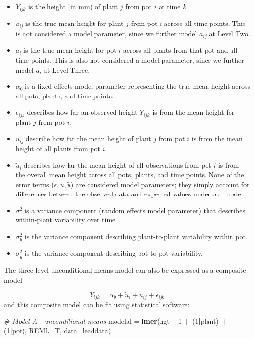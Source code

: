 \documentclass[
]{krantz}
\newenvironment{Shaded}{\begin{snugshade}}{\end{snugshade}}
\newcommand{\CommentTok}[1]{\textcolor[rgb]{0.37,0.37,0.37}{\textit{#1}}}
\newcommand{\DataTypeTok}[1]{\textcolor[rgb]{0.27,0.27,0.27}{#1}}
\newcommand{\DecValTok}[1]{\textcolor[rgb]{0.06,0.06,0.06}{#1}}
\newcommand{\KeywordTok}[1]{\textcolor[rgb]{0.27,0.27,0.27}{\textbf{#1}}}
\newcommand{\NormalTok}[1]{#1}
\newcommand{\OperatorTok}[1]{\textcolor[rgb]{0.43,0.43,0.43}{\textbf{#1}}}
\newcommand{\StringTok}[1]{\textcolor[rgb]{0.5,0.5,0.5}{#1}}
\providecommand{\tightlist}{%
  \setlength{\itemsep}{0pt}\setlength{\parskip}{0pt}}
\begin{document}
\begin{itemize}
\tightlist
\item
  \(Y_{ijk}\) is the height (in mm) of plant \(j\) from pot \(i\) at time \(k\)
\item
  \(a_{ij}\) is the true mean height for plant \(j\) from pot \(i\) across all time points. This is not considered a model parameter, since we further model \(a_{ij}\) at Level Two.
\item
  \(a_{i}\) is the true mean height for pot \(i\) across all plants from that pot and all time points. This is also not considered a model parameter, since we further model \(a_{i}\) at Level Three.
\item
  \(\alpha_{0}\) is a fixed effects model parameter representing the true mean height across all pots, plants, and time points.
\item
  \(\epsilon_{ijk}\) describes how far an observed height \(Y_{ijk}\) is from the mean height for plant \(j\) from pot \(i\).
\item
  \(u_{ij}\) describe how far the mean height of plant \(j\) from pot \(i\) is from the mean height of all plants from pot \(i\).
\item
  \(\tilde{u}_{i}\) describes how far the mean height of all observations from pot \(i\) is from the overall mean height across all pots, plants, and time points. None of the error terms (\(\epsilon, u, \tilde{u}\)) are considered model parameters; they simply account for differences between the observed data and expected values under our model.
\item
  \(\sigma^2\) is a variance component (random effects model parameter) that describes within-plant variability over time.
\item
  \(\sigma_{u}^{2}\) is the variance component describing plant-to-plant variability within pot.
\item
  \(\sigma_{\tilde{u}}^{2}\) is the variance component describing pot-to-pot variability.
\end{itemize}

The three-level unconditional means model can also be expressed as a composite model:

\begin{equation*}
Y_{ijk}=\alpha_{0}+\tilde{u}_{i}+u_{ij}+\epsilon_{ijk}
\end{equation*}
and this composite model can be fit using statistical software:

\begin{Shaded}
\begin{Highlighting}[]
\CommentTok{# Model A - unconditional means}
\NormalTok{modelal =}\StringTok{ }\KeywordTok{lmer}\NormalTok{(hgt }\OperatorTok{~}\StringTok{ }\DecValTok{1} \OperatorTok{+}\StringTok{ }\NormalTok{(}\DecValTok{1}\OperatorTok{|}\NormalTok{plant) }\OperatorTok{+}\StringTok{ }\NormalTok{(}\DecValTok{1}\OperatorTok{|}\NormalTok{pot), }
               \DataTypeTok{REML=}\NormalTok{T, }\DataTypeTok{data=}\NormalTok{leaddata)}
\end{Highlighting}
\end{Shaded}
\end{document}
